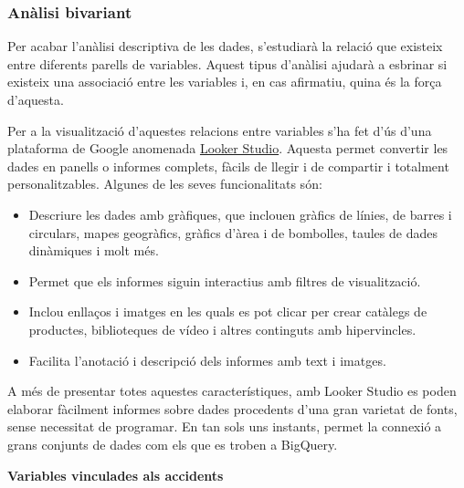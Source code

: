 \documentclass[12pt,longbibliography]{article}
\theoremstyle{definition}
\theoremstyle{remark}
\begin{document}
\subsubsection{Anàlisi bivariant}


Per acabar l'anàlisi descriptiva de les dades, s'estudiarà la relació que existeix entre diferents parells de variables. Aquest tipus d'anàlisi ajudarà a esbrinar si existeix una associació entre les variables i, en cas afirmatiu, quina és la força d'aquesta.


Per a la visualització d'aquestes relacions entre variables s'ha fet d'ús d'una plataforma de Google anomenada \href{https://datastudio.google.com/overview}{Looker Studio}. Aquesta permet convertir les dades en panells o informes complets, fàcils de llegir i de compartir i totalment personalitzables. Algunes de les seves funcionalitats són:


\begin{itemize}

\item Descriure les dades amb gràfiques, que inclouen gràfics de línies, de barres i circulars, mapes geogràfics, gràfics d'àrea i de bombolles, taules de dades dinàmiques i molt més.

\item Permet que els informes siguin interactius amb filtres de visualització.

\item Inclou enllaços i imatges en les quals es pot clicar per crear catàlegs de productes, biblioteques de vídeo i altres continguts amb hipervincles.

\item Facilita l'anotació i descripció dels informes amb text i imatges.

\end{itemize}


A més de presentar totes aquestes característiques, amb Looker Studio es poden elaborar fàcilment informes sobre dades procedents d'una gran varietat de fonts, sense necessitat de programar. En tan sols uns instants, permet la connexió a grans conjunts de dades com els que es troben a BigQuery.


\textbf{Variables vinculades als accidents}
\end{document}
